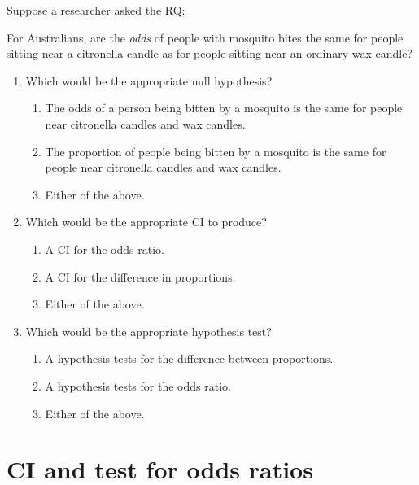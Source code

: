 \documentclass[
  11pt,
  a4paper,
  krantz2]{krantz}
\makeatletter
\providecommand{\tightlist}{%
  \setlength{\itemsep}{0pt}\setlength{\parskip}{0pt}}
\renewenvironment{quote}%
{\begin{kframe}}
{\end{kframe}}
\newenvironment{kframe}{%
\medskip{}
\setlength{\fboxsep}{.8em}
 \def\at@end@of@kframe{}%
 \ifinner\ifhmode%
  \def\at@end@of@kframe{\end{minipage}}%
  \begin{minipage}{\columnwidth}%
 \fi\fi%
 \def\FrameCommand##1{\hskip\@totalleftmargin \hskip-\fboxsep
 \colorbox{shadecolor}{##1}\hskip-\fboxsep
     \hskip-\linewidth \hskip-\@totalleftmargin \hskip\columnwidth}%
 \MakeFramed {\advance\hsize-\width
   \@totalleftmargin\z@ \linewidth\hsize
   \@setminipage}}%
 {\par\unskip\endMakeFramed%
 \at@end@of@kframe}
\renewenvironment{quote}
               {\list{}{\vspace{-0.5em}\begin{kframe}\small%
                        \rightmargin   \leftmargin
                        \parsep        \z@ \@plus\p@}%
                \item\relax}
               {\end{kframe}\endlist}
\makeatother
\begin{document}
Suppose a researcher asked the RQ:

\begin{quote}
For Australians, are the \emph{odds} of people with mosquito bites the same for people sitting near a citronella candle as for people sitting near an ordinary wax candle?
\end{quote}

\begin{enumerate}
\def\labelenumi{\arabic{enumi}.}
\item
  Which would be the appropriate null hypothesis?
  \null

  \begin{enumerate}
  \def\labelenumii{\alph{enumii}.}
  \tightlist
  \item
    The odds of a person being bitten by a mosquito is the same for people near citronella candles and wax candles.
  \item
    The proportion of people being bitten by a mosquito is the same for people near citronella candles and wax candles.
  \item
    Either of the above.
  \end{enumerate}
\item
  Which would be the appropriate CI to produce?
  \null

  \begin{enumerate}
  \def\labelenumii{\alph{enumii}.}
  \tightlist
  \item
    A CI for the odds ratio.
  \item
    A CI for the difference in proportions.
  \item
    Either of the above.
  \end{enumerate}
\item
  Which would be the appropriate hypothesis test?
  \null

  \begin{enumerate}
  \def\labelenumii{\alph{enumii}.}
  \tightlist
  \item
    A hypothesis tests for the difference between proportions.
  \item
    A hypothesis tests for the odds ratio.
  \item
    Either of the above.
  \end{enumerate}
\end{enumerate}

\section{CI and test for odds ratios}\label{OddsSoftware}
\end{document}

